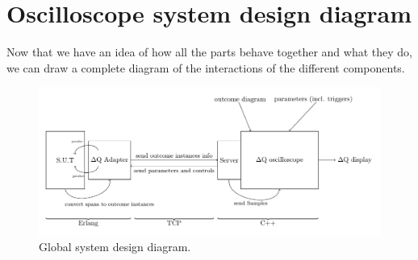 \section{Oscilloscope system design diagram}
    Now that we have an idea of how all the parts behave together and what they do, we can draw a complete diagram of the interactions of the different components.

    \begin{figure}[H]
    \begin{center}
        \includegraphics[width=\textwidth]{tikz/sut-stub-osc.pdf}
    \end{center}
    \caption{Global system design diagram.}
    \end{figure}

